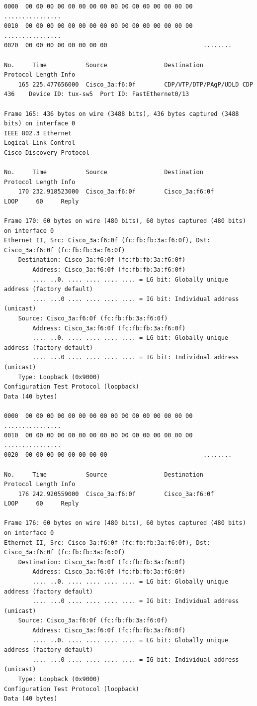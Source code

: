 \documentclass[a4paper,11pt]{article}
\begin{document}
\begin{lstlisting}
0000  00 00 00 00 00 00 00 00 00 00 00 00 00 00 00 00   ................
0010  00 00 00 00 00 00 00 00 00 00 00 00 00 00 00 00   ................
0020  00 00 00 00 00 00 00 00                           ........

No.     Time           Source                Destination           Protocol Length Info
    165 225.477656000  Cisco_3a:f6:0f        CDP/VTP/DTP/PAgP/UDLD CDP      436    Device ID: tux-sw5  Port ID: FastEthernet0/13  

Frame 165: 436 bytes on wire (3488 bits), 436 bytes captured (3488 bits) on interface 0
IEEE 802.3 Ethernet 
Logical-Link Control
Cisco Discovery Protocol

No.     Time           Source                Destination           Protocol Length Info
    170 232.918523000  Cisco_3a:f6:0f        Cisco_3a:f6:0f        LOOP     60     Reply

Frame 170: 60 bytes on wire (480 bits), 60 bytes captured (480 bits) on interface 0
Ethernet II, Src: Cisco_3a:f6:0f (fc:fb:fb:3a:f6:0f), Dst: Cisco_3a:f6:0f (fc:fb:fb:3a:f6:0f)
    Destination: Cisco_3a:f6:0f (fc:fb:fb:3a:f6:0f)
        Address: Cisco_3a:f6:0f (fc:fb:fb:3a:f6:0f)
        .... ..0. .... .... .... .... = LG bit: Globally unique address (factory default)
        .... ...0 .... .... .... .... = IG bit: Individual address (unicast)
    Source: Cisco_3a:f6:0f (fc:fb:fb:3a:f6:0f)
        Address: Cisco_3a:f6:0f (fc:fb:fb:3a:f6:0f)
        .... ..0. .... .... .... .... = LG bit: Globally unique address (factory default)
        .... ...0 .... .... .... .... = IG bit: Individual address (unicast)
    Type: Loopback (0x9000)
Configuration Test Protocol (loopback)
Data (40 bytes)

0000  00 00 00 00 00 00 00 00 00 00 00 00 00 00 00 00   ................
0010  00 00 00 00 00 00 00 00 00 00 00 00 00 00 00 00   ................
0020  00 00 00 00 00 00 00 00                           ........

No.     Time           Source                Destination           Protocol Length Info
    176 242.920559000  Cisco_3a:f6:0f        Cisco_3a:f6:0f        LOOP     60     Reply

Frame 176: 60 bytes on wire (480 bits), 60 bytes captured (480 bits) on interface 0
Ethernet II, Src: Cisco_3a:f6:0f (fc:fb:fb:3a:f6:0f), Dst: Cisco_3a:f6:0f (fc:fb:fb:3a:f6:0f)
    Destination: Cisco_3a:f6:0f (fc:fb:fb:3a:f6:0f)
        Address: Cisco_3a:f6:0f (fc:fb:fb:3a:f6:0f)
        .... ..0. .... .... .... .... = LG bit: Globally unique address (factory default)
        .... ...0 .... .... .... .... = IG bit: Individual address (unicast)
    Source: Cisco_3a:f6:0f (fc:fb:fb:3a:f6:0f)
        Address: Cisco_3a:f6:0f (fc:fb:fb:3a:f6:0f)
        .... ..0. .... .... .... .... = LG bit: Globally unique address (factory default)
        .... ...0 .... .... .... .... = IG bit: Individual address (unicast)
    Type: Loopback (0x9000)
Configuration Test Protocol (loopback)
Data (40 bytes)


\end{lstlisting}
\end{document}
